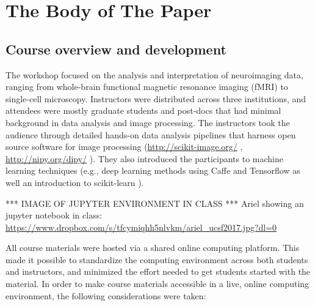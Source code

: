 \section{The Body of The Paper}

\subsection{Course overview and development}

The workshop focused on the analysis and interpretation of neuroimaging data,
ranging from whole-brain functional magnetic resonance imaging (fMRI) to
single-cell microscopy. Instructors were distributed across three institutions,
and attendees were mostly graduate students and post-docs that had minimal
background in data analysis and image processing. The instructors took the
audience through detailed hands-on data analysis pipelines that harness open
source software for image processing  (\url{http://scikit-image.org/}
\cite{van2014scikit}, \url{http://nipy.org/dipy/}
\cite{Garyfallidis2014FrontNeuroinf}). They also introduced the participants to
machine learning techniques (e.g., deep learning methods using Caffe
\cite{jia2014caffe} and Tensorflow \cite{abadi2016tensorflow} as well an
introduction to scikit-learn \cite{Pedregosa2012-dm}).

*** IMAGE OF JUPYTER ENVIRONMENT IN CLASS ***
Ariel showing an jupyter notebook in class: \url{https://www.dropbox.com/s/tfcymiqhh5nlvkm/ariel_ucsf2017.jpg?dl=0}

All course materials were hosted via a shared online computing platform. This
made it possible to standardize the computing environment across both students
and instructors, and minimized the effort needed to get students started with
the material. In order to make course materials accessible in a live, online
computing environment, the following considerations were taken:

